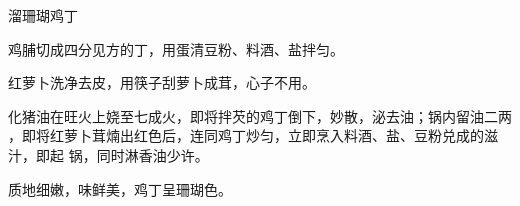 \begin{recipe}{溜珊瑚鸡丁}

\ingredients


\preparation

\step 鸡脯切成四分见方的丁，用蛋清豆粉、料酒、盐拌匀。

\step 红萝卜洗净去皮，用筷子刮萝卜成茸，心子不用。

\step 化猪油在旺火上娆至七成火，即将拌芡的鸡丁倒下，妙散，泌去油；锅内留油二两
，即将红萝卜茸煵出红色后，连同鸡丁炒匀，立即烹入料酒、盐、豆粉兑成的滋汁，即起
锅，同时淋香油少许。

\features

质地细嫩，味鲜美，鸡丁呈珊瑚色。

\end{recipe}

